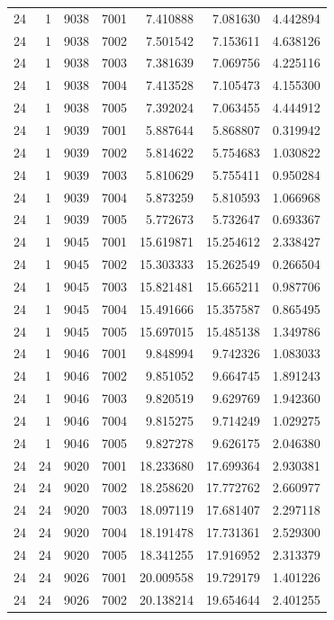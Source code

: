 \begin{table}
\begin{tabular}{rrrrrrr}
24 & 1 & 9038 & 7001 & 7.410888 & 7.081630 & 4.442894 \\
24 & 1 & 9038 & 7002 & 7.501542 & 7.153611 & 4.638126 \\
24 & 1 & 9038 & 7003 & 7.381639 & 7.069756 & 4.225116 \\
24 & 1 & 9038 & 7004 & 7.413528 & 7.105473 & 4.155300 \\
24 & 1 & 9038 & 7005 & 7.392024 & 7.063455 & 4.444912 \\
24 & 1 & 9039 & 7001 & 5.887644 & 5.868807 & 0.319942 \\
24 & 1 & 9039 & 7002 & 5.814622 & 5.754683 & 1.030822 \\
24 & 1 & 9039 & 7003 & 5.810629 & 5.755411 & 0.950284 \\
24 & 1 & 9039 & 7004 & 5.873259 & 5.810593 & 1.066968 \\
24 & 1 & 9039 & 7005 & 5.772673 & 5.732647 & 0.693367 \\
24 & 1 & 9045 & 7001 & 15.619871 & 15.254612 & 2.338427 \\
24 & 1 & 9045 & 7002 & 15.303333 & 15.262549 & 0.266504 \\
24 & 1 & 9045 & 7003 & 15.821481 & 15.665211 & 0.987706 \\
24 & 1 & 9045 & 7004 & 15.491666 & 15.357587 & 0.865495 \\
24 & 1 & 9045 & 7005 & 15.697015 & 15.485138 & 1.349786 \\
24 & 1 & 9046 & 7001 & 9.848994 & 9.742326 & 1.083033 \\
24 & 1 & 9046 & 7002 & 9.851052 & 9.664745 & 1.891243 \\
24 & 1 & 9046 & 7003 & 9.820519 & 9.629769 & 1.942360 \\
24 & 1 & 9046 & 7004 & 9.815275 & 9.714249 & 1.029275 \\
24 & 1 & 9046 & 7005 & 9.827278 & 9.626175 & 2.046380 \\
24 & 24 & 9020 & 7001 & 18.233680 & 17.699364 & 2.930381 \\
24 & 24 & 9020 & 7002 & 18.258620 & 17.772762 & 2.660977 \\
24 & 24 & 9020 & 7003 & 18.097119 & 17.681407 & 2.297118 \\
24 & 24 & 9020 & 7004 & 18.191478 & 17.731361 & 2.529300 \\
24 & 24 & 9020 & 7005 & 18.341255 & 17.916952 & 2.313379 \\
24 & 24 & 9026 & 7001 & 20.009558 & 19.729179 & 1.401226 \\
24 & 24 & 9026 & 7002 & 20.138214 & 19.654644 & 2.401255 \\

\end{tabular}
\end{table}
